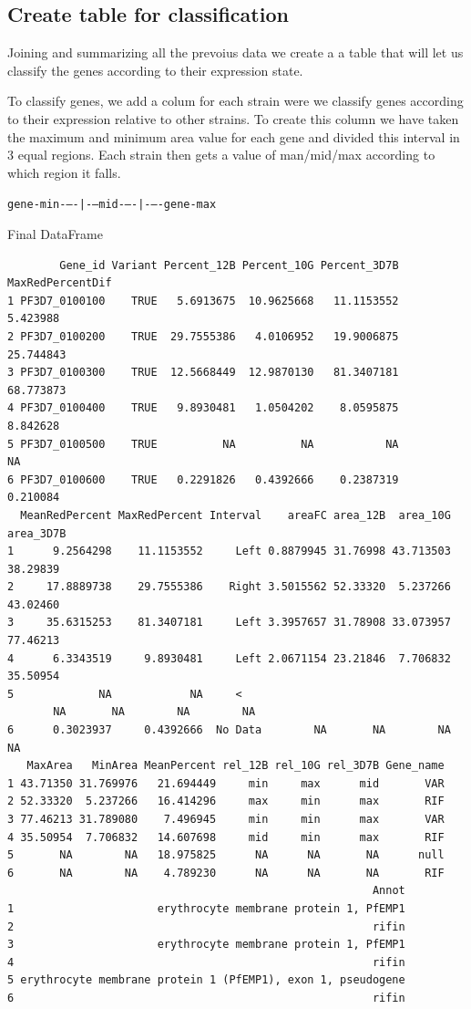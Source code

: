 \documentclass[11pt]{article}
\begin{document}
\subsection{Create table for classification}
\label{sec:orgb478a2e}

Joining and summarizing all the prevoius data we create a a table that will let us classify the genes according to their expression state.

To classify genes, we add a colum for each strain were we classify genes according to their expression relative to other strains.
To create this column we have taken the maximum and minimum area value for each gene and divided this interval in 3 equal regions. Each strain then gets a value of man/mid/max according to which region it falls.

\texttt{gene-min-{}--{}-|-{}--mid-{}--{}-|-{}--{}-gene-max}

Final DataFrame
\begin{verbatim}
        Gene_id Variant Percent_12B Percent_10G Percent_3D7B MaxRedPercentDif
1 PF3D7_0100100    TRUE   5.6913675  10.9625668   11.1153552         5.423988
2 PF3D7_0100200    TRUE  29.7555386   4.0106952   19.9006875        25.744843
3 PF3D7_0100300    TRUE  12.5668449  12.9870130   81.3407181        68.773873
4 PF3D7_0100400    TRUE   9.8930481   1.0504202    8.0595875         8.842628
5 PF3D7_0100500    TRUE          NA          NA           NA               NA
6 PF3D7_0100600    TRUE   0.2291826   0.4392666    0.2387319         0.210084
  MeanRedPercent MaxRedPercent Interval    areaFC area_12B  area_10G area_3D7B
1      9.2564298    11.1153552     Left 0.8879945 31.76998 43.713503  38.29839
2     17.8889738    29.7555386    Right 3.5015562 52.33320  5.237266  43.02460
3     35.6315253    81.3407181     Left 3.3957657 31.78908 33.073957  77.46213
4      6.3343519     9.8930481     Left 2.0671154 23.21846  7.706832  35.50954
5             NA            NA     <
       NA       NA        NA        NA
6      0.3023937     0.4392666  No Data        NA       NA        NA        NA
   MaxArea   MinArea MeanPercent rel_12B rel_10G rel_3D7B Gene_name
1 43.71350 31.769976   21.694449     min     max      mid       VAR
2 52.33320  5.237266   16.414296     max     min      max       RIF
3 77.46213 31.789080    7.496945     min     min      max       VAR
4 35.50954  7.706832   14.607698     mid     min      max       RIF
5       NA        NA   18.975825      NA      NA       NA      null
6       NA        NA    4.789230      NA      NA       NA       RIF
                                                        Annot
1                      erythrocyte membrane protein 1, PfEMP1
2                                                       rifin
3                      erythrocyte membrane protein 1, PfEMP1
4                                                       rifin
5 erythrocyte membrane protein 1 (PfEMP1), exon 1, pseudogene
6                                                       rifin
\end{verbatim}
\end{document}
